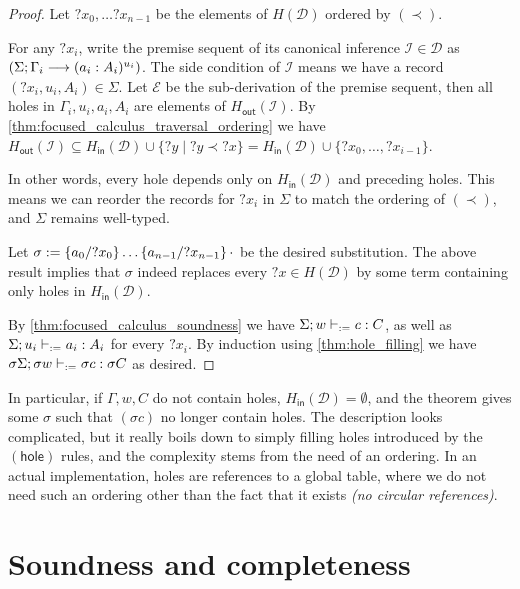 \documentclass[twoside]{report}
\begin{document}
\begin{proof}
Let ${?x_0}, \ldots {?x_{n-1}}$ be the elements of $H(\mathcal D)$ ordered by $(\prec)$.

For any ${?x_i}$, write the premise sequent of its canonical inference $\mathcal I \in \mathcal D$ as $(\Sigma; \Gamma_i \vdashf (a_i : A_i)^{u_i})$. The side condition of $\mathcal I$ means we have a record $({?x_i}, u_i, A_i) \in \Sigma$. Let $\mathcal E$ be the sub-derivation of the premise sequent, then all holes in $\Gamma_i, u_i, a_i, A_i$ are elements of $H_{\mathsf{out}}(\mathcal I)$. By \cref{thm:focused_calculus_traversal_ordering} we have $H_{\mathsf{out}}(\mathcal I) \subseteq H_{\mathsf{in}}(\mathcal D) \cup \{{?y} \mid {?y} \prec {?x}\} = H_{\mathsf{in}}(\mathcal D) \cup \{{?x_0}, \ldots, {?x_{i-1}}\}$.

In other words, every hole depends only on $H_{\mathsf{in}}(\mathcal D)$ and preceding holes. This means we can reorder the records for ${?x_i}$ in $\Sigma$ to match the ordering of $(\prec)$, and $\Sigma$ remains well-typed.

Let $\sigma \defeq \subst {?x_0} {a_0} {\ldots \subst {?x_{n-1}} {a_{n-1}} {\cdot}}$ be the desired substitution. The above result implies that $\sigma$ indeed replaces every ${?x} \in H(\mathcal D)$ by some term containing only holes in $H_{\mathsf{in}}(\mathcal D)$.

By \cref{thm:focused_calculus_soundness} we have $\Sigma; w \vdashd c : C$, as well as $\Sigma; u_i \vdashd a_i : A_i$ for every ${?x_i}$. By induction using \cref{thm:hole_filling} we have $\sigma \Sigma; \sigma w \vdashd \sigma c : \sigma C$ as desired.
\end{proof}

In particular, if $\Gamma, w, C$ do not contain holes, $H_{\mathsf{in}}(\mathcal D) = \emptyset$, and the theorem gives some $\sigma$ such that $(\sigma c)$ no longer contain holes. The description looks complicated, but it really boils down to simply filling holes introduced by the $(\mathsf{hole})$ rules, and the complexity stems from the need of an ordering. In an actual implementation, holes are references to a global table, where we do not need such an ordering other than the fact that it exists \emph{(no circular references)}.

\section{Soundness and completeness}
\label{sec:sequent_calculi_soundness_and_completeness}
\end{document}
